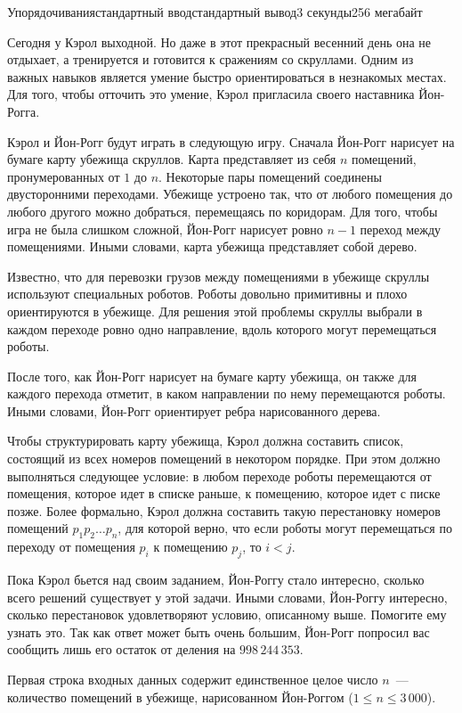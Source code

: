 \begin{problem}{Упорядочивания}{стандартный ввод}{стандартный вывод}{3 секунды}{256 мегабайт}

Сегодня у Кэрол выходной. Но даже в этот прекрасный весенний день она не отдыхает, а тренируется и готовится к сражениям со скруллами. Одним из важных навыков является умение быстро ориентироваться в незнакомых местах. Для того, чтобы отточить это умение, Кэрол пригласила своего наставника Йон-Рогга.

Кэрол и Йон-Рогг будут играть в следующую игру. Сначала Йон-Рогг нарисует на бумаге карту убежища скруллов. Карта представляет из себя $n$ помещений, пронумерованных от $1$ до $n$. Некоторые пары помещений соединены двусторонними переходами. Убежище устроено так, что от любого помещения до любого другого можно добраться, перемещаясь по коридорам. Для того, чтобы игра не была слишком сложной, Йон-Рогг нарисует ровно $n - 1$ переход между помещениями. Иными словами, карта убежища представляет собой дерево.

Известно, что для перевозки грузов между помещениями в убежище скруллы используют специальных роботов. Роботы довольно примитивны и плохо ориентируются в убежище. Для решения этой проблемы скруллы выбрали в каждом переходе ровно одно направление, вдоль которого могут перемещаться роботы.

После того, как Йон-Рогг нарисует на бумаге карту убежища, он также для каждого перехода отметит, в каком направлении по нему перемещаются роботы. Иными словами, Йон-Рогг ориентирует ребра нарисованного дерева.

Чтобы структурировать карту убежища, Кэрол должна составить список, состоящий из всех номеров помещений в некотором порядке. При этом должно выполняться следующее условие: в любом переходе роботы перемещаются от помещения, которое идет в списке раньше, к помещению, которое идет с писке позже. Более формально, Кэрол должна составить такую перестановку номеров помещений $p_1 p_2 \ldots p_n$, для которой верно, что если роботы могут перемещаться по переходу от помещения $p_i$ к помещению $p_j$, то $i < j$.

Пока Кэрол бьется над своим заданием, Йон-Роггу стало интересно, сколько всего решений существует у этой задачи. Иными словами, Йон-Роггу интересно, сколько перестановок удовлетворяют условию, описанному выше. Помогите ему узнать это. Так как ответ может быть очень большим, Йон-Рогг попросил вас сообщить лишь его остаток от деления на $998\,244\,353$.

\InputFile
Первая строка входных данных содержит единственное целое число $n$~--- количество помещений в убежище, нарисованном Йон-Роггом ($1 \le n \le 3\,000$).


\end{problem}
